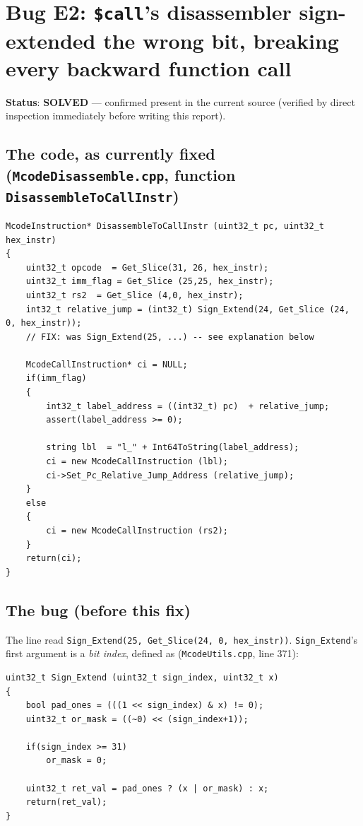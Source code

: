 \documentclass[11pt,a4paper]{report}
\begin{document}
\section{Bug E2: \texttt{\$call}'s disassembler sign-extended the wrong bit, breaking every backward function call}

\textbf{Status}: \textbf{SOLVED} --- confirmed present in the current source (verified by
direct inspection immediately before writing this report).

\subsection*{The code, as currently fixed (\texttt{McodeDisassemble.cpp}, function \texttt{DisassembleToCallInstr})}

\begin{lstlisting}[caption={\texttt{McodeDisassemble.cpp}, lines 261--284 (current, fixed state)}]
McodeInstruction* DisassembleToCallInstr (uint32_t pc, uint32_t hex_instr)
{
    uint32_t opcode  = Get_Slice(31, 26, hex_instr);
    uint32_t imm_flag = Get_Slice (25,25, hex_instr);
    uint32_t rs2  = Get_Slice (4,0, hex_instr);
    int32_t relative_jump = (int32_t) Sign_Extend(24, Get_Slice (24, 0, hex_instr));
    // FIX: was Sign_Extend(25, ...) -- see explanation below

    McodeCallInstruction* ci = NULL;
    if(imm_flag)
    {
        int32_t label_address = ((int32_t) pc)  + relative_jump;
        assert(label_address >= 0);

        string lbl  = "l_" + Int64ToString(label_address);
        ci = new McodeCallInstruction (lbl);
        ci->Set_Pc_Relative_Jump_Address (relative_jump);
    }
    else
    {
        ci = new McodeCallInstruction (rs2);
    }
    return(ci);
}
\end{lstlisting}

\subsection*{The bug (before this fix)}
The line read \texttt{Sign\_Extend(25, Get\_Slice(24, 0, hex\_instr))}. \texttt{Sign\_Extend}'s
first argument is a \emph{bit index}, defined as (\texttt{McodeUtils.cpp}, line 371):

\begin{lstlisting}[caption={\texttt{McodeUtils.cpp}, lines 371--382 --- \texttt{Sign\_Extend}'s definition}]
uint32_t Sign_Extend (uint32_t sign_index, uint32_t x)
{
    bool pad_ones = (((1 << sign_index) & x) != 0);
    uint32_t or_mask = ((~0) << (sign_index+1));

    if(sign_index >= 31)
        or_mask = 0;

    uint32_t ret_val = pad_ones ? (x | or_mask) : x;
    return(ret_val);
}
\end{lstlisting}
\end{document}

